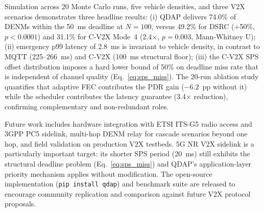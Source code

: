 \documentclass[journal]{IEEEtran}
\begin{document}
Simulation across 20 Monte Carlo runs, five vehicle densities, and three V2X
scenarios demonstrates three headline results:
(i) QDAP delivers 74.0\% of DENMs within the \SI{50}{\milli\second} deadline
at $N{=}100$, versus 49.2\% for DSRC (+50\%, $p < 0.0001$) and 31.1\% for
C-V2X Mode~4 (2.4$\times$, $p{=}0.003$, Mann-Whitney U);
(ii) emergency p99 latency of \SI{2.8}{\milli\second} is invariant to vehicle
density, in contrast to MQTT (225--266~ms) and C-V2X (100~ms structural floor);
(iii) the C-V2X SPS offset distribution imposes a hard lower bound of 50\%
on deadline miss rate that is independent of channel quality (Eq.~\ref{eq:sps_miss}).
The 20-run ablation study quantifies that adaptive FEC contributes the PDR gain
($-6.2$~pp without it) while the scheduler contributes the latency guarantee
(3.4$\times$ reduction), confirming complementary and non-redundant roles.

Future work includes hardware integration with ETSI ITS-G5 radio access
and 3GPP PC5 sidelink, multi-hop DENM relay for cascade scenarios beyond
one hop, and field validation on production V2X testbeds.
5G NR V2X sidelink is a particularly important target: its shorter SPS period
(20~ms) still exhibits the structural deadline problem (Eq.~\ref{eq:sps_miss})
and QDAP's application-layer priority mechanism applies without modification.
The open-source implementation (\texttt{pip install qdap}) and benchmark suite
are released to encourage community replication and comparison against future
V2X protocol proposals.


\balance   %


\end{document}
